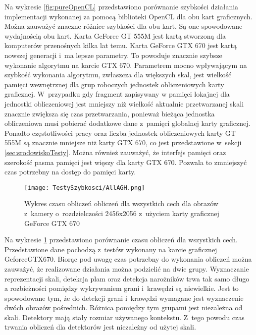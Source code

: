 Na wykresie \ref{fig:pureOpenCL} przedstawiono porównanie szybkości działania implementacji wykonanej za pomocą biblioteki OpenCL dla obu kart graficznych. Można zauważyć znaczne różnice szybkości dla obu kart. Są one spowodowane wydajnością obu kart. Karta GeForce GT 555M jest kartą stworzoną dla komputerów przenośnych kilka lat temu. Karta GeForce GTX 670 jest kartą nowszej generacji i~ma lepsze parametry. To powoduje znacznie szybsze wykonanie algorytmu na karcie GTX 670. Parametrem mocno wpływającym na szybkość wykonania algorytmu, zwłaszcza dla większych skal, jest wielkość pamięci wewnętrznej dla grup roboczych jednostek obliczeniowych karty graficznej. W~przypadku gdy fragment zapisywany w pamięci lokajnej dla jednostki obliczeniowej jest mniejszy niż wielkość aktualnie przetwarzanej skali znacznie zwiększa się czas przetwarzania, ponieważ bieżąca jednostka obliczeniowa musi pobierać dodatkowe dane z~pamięci globalnej karty graficznej. Ponadto częstotliwości pracy oraz liczba jednostek obliczeniowych karty GT 555M są znacznie mniejsze niż karty GTX 670, co jest przedstawione w~sekcji \ref{sec:srodowiskoTesty}. Można również zauważyć, że interfejs pamięci oraz szerokość pasma pamięci jest więszy dla karty GTX 670. Pozwala to zmniejszyć czas potrzebny na dostęp do pamięci karty.

\begin{figure}[h]
\begin{center}
\texttt{[image: TestySzybkosci/AllAGH.png]}
\end{center}
\caption{Wykres czasu obliczeń obliczeń dla wszystkich cech dla obrazów z~kamery o~rozdzielczości 2456x2056 z~użyciem karty graficznej GeForce GTX 670}
\label{fig:AllAGH}
\end{figure}

Na wykresie \ref{fig:AllAGH} przedstawiono porównanie czasu obliczeń dla wszystkich cech. Przedstawione dane pochodzą z~testów wykonany na karcie graficznej GeforceGTX670. Biorąc pod uwagę czas potrzebny do wykonania obliczeń można zauważyć, że realizowane działania można podzielić na dwie grupy. Wyznaczanie reprezentacji skali, detekcja plam oraz detekcja narożników trwa tak samo długo a rozbieżności pomiędzy wykrywaniem grani i~krawędzi są niewielkie. Jest to spowodowane tym, że do detekcji grani i~krawędzi wymagane jest wyznaczenie dwóch obrazów pośrednich. Różnica pomiędzy tym grupami jest niezależna od skali. Detektory mają stały rozmiar używanego kontekstu. Z~tego powodu czas trwania obliczeń dla detektorów jest niezależny od użytej skali.